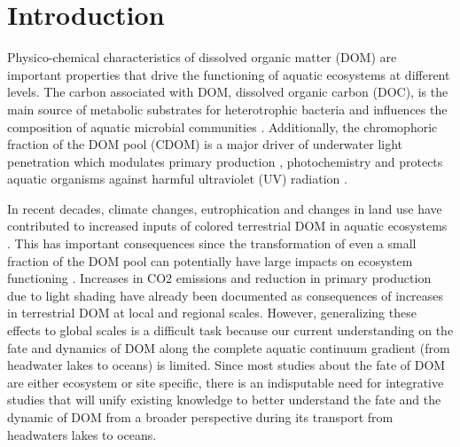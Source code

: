 
\section*{Introduction}
\label{sec:Introduction}

Physico-chemical characteristics of dissolved organic matter (DOM) are important properties that drive the functioning of aquatic ecosystems at different levels. The carbon associated with DOM, dissolved organic carbon (DOC), is the main source of metabolic substrates for heterotrophic bacteria and influences the composition of aquatic microbial communities \citep{Findlay2003}. Additionally, the chromophoric fraction of the DOM pool (CDOM) is a major driver of underwater light penetration \citep{Kirk1994} which modulates primary production \citep{Markager2004, Thrane2014, Seekell2015}, photochemistry and protects aquatic organisms against harmful ultraviolet (UV) radiation \citep{Rautio2002}.

In recent decades, climate changes, eutrophication and changes in land use have contributed to increased inputs of colored terrestrial DOM in aquatic ecosystems \citep{Roulet2006, Massicotte2013RSE, Weyhenmeyer2014, Haaland2010}. This has important consequences since the transformation of even a small fraction of the DOM pool can potentially have large impacts on ecosystem functioning \citep{Prairie2008}. Increases in CO2 emissions \citep{Lapierre2013} and reduction in primary production due to light shading \citep{Seekell2015, Thrane2014} have already been documented as consequences of increases in terrestrial DOM at local and regional scales. However, generalizing these effects to global scales is a difficult task because our current understanding on the fate and dynamics of DOM along the complete aquatic continuum gradient (from headwater lakes to oceans) is limited. Since most studies about the fate of DOM are either ecosystem or site specific, there is an indisputable need for integrative studies that will unify existing knowledge to better understand the fate and the dynamic of DOM from a broader perspective during its transport from headwaters lakes to oceans.

